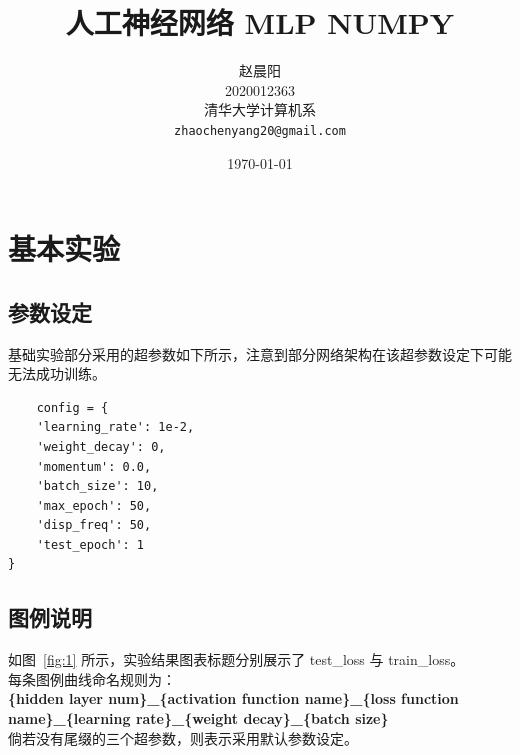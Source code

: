 \documentclass{article}
\title{人工神经网络 MLP NUMPY}
\date{\today}
\author{
	赵晨阳\\
	2020012363\\
	清华大学计算机系\\
	\texttt{zhaochenyang20@gmail.com}
}
\begin{document}
\maketitle

\tableofcontents

\section{基本实验}
\subsection{参数设定}
基础实验部分采用的超参数如下所示，注意到部分网络架构在该超参数设定下可能无法成功训练。
\begin{verbatim}
	config = {
    'learning_rate': 1e-2,
    'weight_decay': 0,
    'momentum': 0.0,
    'batch_size': 10,
    'max_epoch': 50,
    'disp_freq': 50,
    'test_epoch': 1
}
\end{verbatim}

\subsection{图例说明}

如图~\ref{fig:1} 所示，实验结果图表标题分别展示了 test\_loss 与 train\_loss。\\
每条图例曲线命名规则为：\\
\textbf{\{hidden layer num\}\_\{activation function name\}\_\{loss function name\}\_\{learning rate\}\_\{weight decay\}\_\{batch size\}}\\
倘若没有尾缀的三个超参数，则表示采用默认参数设定。
\end{document}
